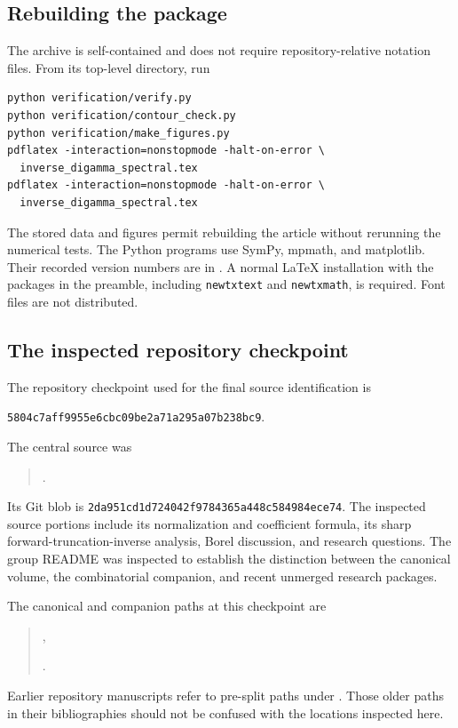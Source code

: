 \documentclass[11pt,a4paper]{article}
\theoremstyle{definition}
\numberwithin{equation}{section}
\begin{document}
\subsection{Rebuilding the package}
The archive is self-contained and does not require repository-relative notation files. From its top-level directory, run
\begin{verbatim}
python verification/verify.py
python verification/contour_check.py
python verification/make_figures.py
pdflatex -interaction=nonstopmode -halt-on-error \
  inverse_digamma_spectral.tex
pdflatex -interaction=nonstopmode -halt-on-error \
  inverse_digamma_spectral.tex
\end{verbatim}
The stored data and figures permit rebuilding the article without rerunning the numerical tests. The Python programs use SymPy, mpmath, and matplotlib. Their recorded version numbers are in . A normal LaTeX installation with the packages in the preamble, including \texttt{newtxtext} and \texttt{newtxmath}, is required. Font files are not distributed.

\subsection{The inspected repository checkpoint}
The repository checkpoint used for the final source identification is
\begin{center}\small
\texttt{5804c7aff9955e6cbc09be2a71a295a07b238bc9}.
\end{center}
The central source was
\begin{quote}\small\raggedright
{}.
\end{quote}
Its Git blob is
\texttt{2da951cd1d724042f9784365a448c584984ece74}.
The inspected source portions include its normalization and coefficient formula, its sharp forward-truncation-inverse analysis, Borel discussion, and research questions. The group README was inspected to establish the distinction between the canonical volume, the combinatorial companion, and recent unmerged research packages.

The canonical and companion paths at this checkpoint are
\begin{quote}\small\raggedright
{},\par
{}.
\end{quote}
Earlier repository manuscripts refer to pre-split paths under
. Those older paths in their bibliographies should not be confused with the locations inspected here.
\end{document}
